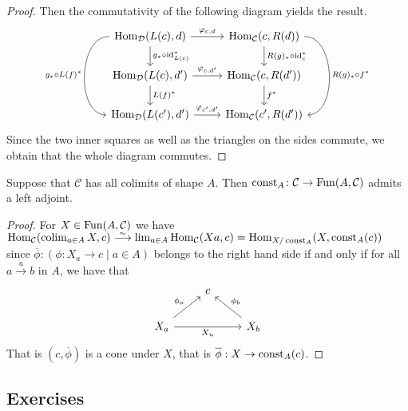 \begin{proof}
    Then the commutativity of the following diagram yields the result.
    \[
    \begin{tikzcd}
        \Hom_\mathcal{D}( L ( c ) , d ) 
        \ar[dd, bend right=90, " g_* \circ L ( f )^* "']
        \ar[d, " g_* \circ \id_{L(c)}^* "]
        \ar[r, " \varphi_{ c , d } "]
        &
        \Hom_\mathcal{C}( c , R ( d ) ) 
        \ar[d , " R ( g )_* \circ \id_c^* "]
        \ar[dd, bend left=90, " R ( g )_* \circ f^* " ]
        \\
        \Hom_\mathcal{D}( L ( c ) , d' )
        \ar[d, " L(f)^* "]
        \ar[r, " \varphi_{ c , d' } "]
        &
        \Hom_\mathcal{C}( c , R ( d' ) )
        \ar[d , " f^* "]
        \\
        \Hom_\mathcal{D}( L ( c' ) , d' ) 
        \ar[r, " \varphi_{ c' , d' } "]
        &
        \Hom_\mathcal{C}( c' , R ( d' ) )
    \end{tikzcd}
    \]
Since the two inner squares as well as the triangles on the sides commute, we obtain that the whole diagram commutes.
\end{proof}

\begin{prop}
    Suppose that $\mathcal{C}$ has all colimits of shape $A$. 
    Then $\operatorname{const}_A \colon \mathcal{C} \to \operatorname{Fun}(A, \mathcal{C})$ admits a left adjoint.
\end{prop}

\begin{proof}
    For $X \in \operatorname{Fun}(A, \mathcal{C})$ we have $\Hom_{\mathcal{C}}(\colim_{a \in A} X,c) \isomorphism \lim_{a \in A} \Hom_{\mathcal{C}}(Xa,c)=\Hom_{X/\const_A}(X, \const_A(c))$ since $\overline{\phi}\colon ( \phi\colon X_a \to c \mid a \in A)$ belongs to the right hand side if and only if for all $a \xrightarrow{u} b$ in $A$, we have that
    \[
    \begin{tikzcd}
        &
        c
        &
        \\
        X_a
        \ar[rr, "X_u"']
        \ar[ur, "\phi_a"]
        &&
        X_b
        \ar[lu, "\phi_b"']
    \end{tikzcd}
    \]
    That is $(c,\overline{\phi})$ is a cone under $X$, that is $\overline{\phi}: X \to \operatorname{const}_A(c)$. 
\end{proof}

\subsection{Exercises}

